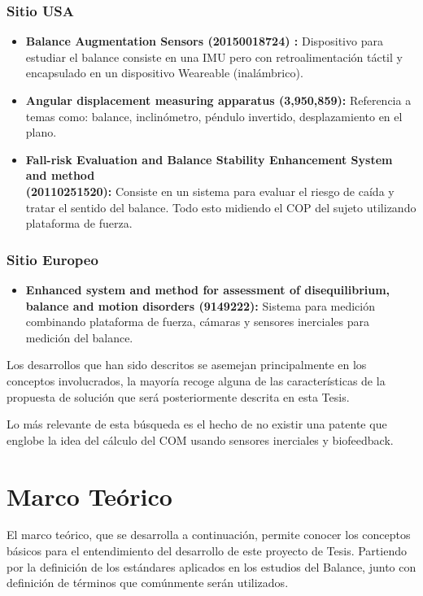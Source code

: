 \documentclass[12pt,a4paper]{article}
\begin{document}
\subsubsection{Sitio USA}
\begin{itemize}
	\item \textbf{Balance Augmentation Sensors (20150018724) :} Dispositivo para estudiar el balance consiste en una IMU pero con retroalimentación táctil y encapsulado en un dispositivo Weareable (inalámbrico).
	\item \textbf{Angular displacement measuring apparatus (3,950,859): } Referencia a temas como: balance, inclinómetro, péndulo invertido, desplazamiento en el plano.
	\item \textbf{Fall-risk Evaluation and Balance Stability Enhancement System and method \\(20110251520):} 
	Consiste en un sistema para evaluar el riesgo de caída y tratar el sentido del balance. Todo esto midiendo el COP del sujeto utilizando plataforma de fuerza.
\end{itemize}

\subsubsection{Sitio Europeo}
\begin{itemize}
	\item \textbf{Enhanced system and method for assessment of disequilibrium, balance and motion disorders (9149222):} Sistema para medición combinando plataforma de fuerza, cámaras y sensores inerciales para medición del balance.
\end{itemize}

Los desarrollos que han sido descritos se asemejan principalmente en los conceptos involucrados, la mayoría recoge alguna de las características de la propuesta de solución que será posteriormente descrita en esta Tesis.

Lo más relevante de esta búsqueda es el hecho de no existir una patente que englobe la idea del cálculo del COM usando sensores inerciales y biofeedback.

\section{Marco Teórico}

El marco teórico, que se desarrolla a continuación, permite conocer los conceptos básicos para el entendimiento del desarrollo de este proyecto de Tesis.
Partiendo por la definición de los estándares aplicados en los estudios del Balance, junto con definición de términos que comúnmente serán utilizados.
\end{document}
